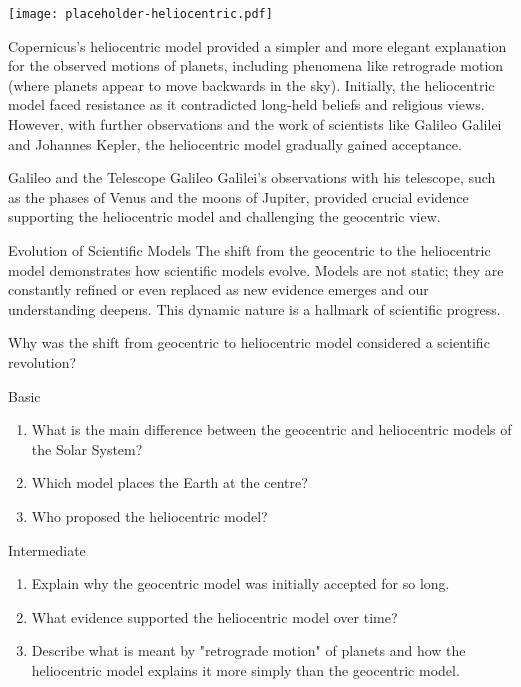 \begin{marginfigure}
\texttt{[image: placeholder-heliocentric.pdf]}
\caption{\label{fig:heliocentric}A simplified diagram of the heliocentric model. \textit{Image to be added.}}
\end{marginfigure}

Copernicus's heliocentric model provided a simpler and more elegant explanation for the observed motions of planets, including phenomena like retrograde motion (where planets appear to move backwards in the sky).  Initially, the heliocentric model faced resistance as it contradicted long-held beliefs and religious views. However, with further observations and the work of scientists like Galileo Galilei and Johannes Kepler, the heliocentric model gradually gained acceptance.

\begin{historylink}{Galileo and the Telescope}
Galileo Galilei's observations with his telescope, such as the phases of Venus and the moons of Jupiter, provided crucial evidence supporting the heliocentric model and challenging the geocentric view.
\end{historylink}

\begin{keyconcept}{Evolution of Scientific Models}
The shift from the geocentric to the heliocentric model demonstrates how scientific models evolve.  Models are not static; they are constantly refined or even replaced as new evidence emerges and our understanding deepens. This dynamic nature is a hallmark of scientific progress.
\end{keyconcept}

\begin{stopandthink}
Why was the shift from geocentric to heliocentric model considered a scientific revolution?
\end{stopandthink}

\begin{tieredquestions}{Basic}
\begin{enumerate}
    \item What is the main difference between the geocentric and heliocentric models of the Solar System?
    \item Which model places the Earth at the centre?
    \item Who proposed the heliocentric model?
\end{enumerate}
\end{tieredquestions}

\begin{tieredquestions}{Intermediate}
\begin{enumerate}
    \item Explain why the geocentric model was initially accepted for so long.
    \item What evidence supported the heliocentric model over time?
    \item Describe what is meant by "retrograde motion" of planets and how the heliocentric model explains it more simply than the geocentric model.
\end{enumerate}
\end{tieredquestions}

